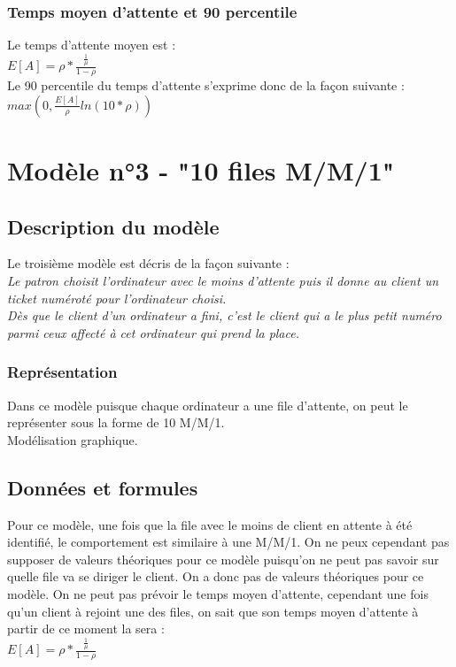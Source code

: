 \documentclass[a4paper,11pt]{article}
\begin{document}
		\subsubsection{Temps moyen d'attente et 90 percentile}
		Le temps d'attente moyen est :\\
		$E[A] = \rho * \frac{\frac{1}{\mu}}{1-\rho}$
		\\
		Le 90 percentile du temps d'attente s'exprime donc de la façon suivante :\\
		$max(0,\frac{E[A]}{\rho}ln(10*\rho))$
		

\section{Modèle n°3 - "10 files M/M/1"}
	\subsection{Description du modèle}
	Le troisième modèle est décris de la façon suivante :\\
	\textit{Le patron choisit l'ordinateur avec le moins d'attente puis il donne au client un ticket numéroté pour l'ordinateur choisi.\\
			Dès que le client d'un ordinateur a fini, c'est le client qui a le plus petit numéro parmi ceux affecté à cet ordinateur qui prend la place.}
	\subsubsection{Représentation}
		Dans ce modèle puisque chaque ordinateur a une file d'attente, on peut le représenter sous la forme de 10 M/M/1.\\

	Modélisation graphique.\\
	
	\subsection{Données et formules}
	Pour ce modèle, une fois que la file avec le moins de client en attente à été identifié, le comportement est similaire à une M/M/1. On ne peux cependant pas supposer de valeurs théoriques pour ce modèle puisqu'on ne peut pas savoir sur quelle file va se diriger le client. On a donc pas de valeurs théoriques pour ce modèle.
	On ne peut pas prévoir le temps moyen d'attente, cependant une fois qu'un client à rejoint une des files, on sait que son temps moyen d'attente à partir de ce moment la sera : \\
	$E[A] = \rho * \frac{\frac{1}{\mu}}{1-\rho}$
	\\
\end{document}
